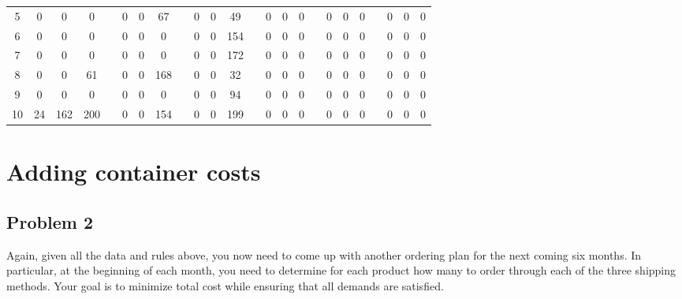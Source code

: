 \documentclass[12pt,a4paper]{article}
\begin{document}
\begin{table}[]
{\begin{tabular}{ccccllcccclccclccclccccc}
5       & 0      & 0       & 0      &  & 0                      & 0  & 67  &                      & 0  & 0                      & 49  &                      & 0  & 0                      & 0  &                      & 0  & 0                      & 0  &                      & 0       & 0       & 0      \\
6       & 0      & 0       & 0      &  & 0                      & 0  & 0   &                      & 0  & 0                      & 154 &                      & 0  & 0                      & 0  &                      & 0  & 0                      & 0  &                      & 0       & 0       & 0      \\
7       & 0      & 0       & 0      &  & 0                      & 0  & 0   &                      & 0  & 0                      & 172 &                      & 0  & 0                      & 0  &                      & 0  & 0                      & 0  &                      & 0       & 0       & 0      \\
8       & 0      & 0       & 61     &  & 0                      & 0  & 168 &                      & 0  & 0                      & 32  &                      & 0  & 0                      & 0  &                      & 0  & 0                      & 0  &                      & 0       & 0       & 0      \\
9       & 0      & 0       & 0      &  & 0                      & 0  & 0   &                      & 0  & 0                      & 94  &                      & 0  & 0                      & 0  &                      & 0  & 0                      & 0  &                      & 0       & 0       & 0      \\
10      & 24     & 162     & 200    &  & 0                      & 0  & 154 &                      & 0  & 0                      & 199 &                      & 0  & 0                      & 0  &                      & 0  & 0                      & 0  &                      & 0       & 0       & 0      \\ \hline
\end{tabular}}
\end{table}

\section{Adding container costs}
\subsection*{Problem 2}
Again, given all the data and rules above, you now need to come up with another ordering
plan for the next coming six months. In particular, at the beginning of each month, you
need to determine for each product how many to order through each of the three shipping
methods. Your goal is to minimize total cost while ensuring that all demands are satisfied.\\
\end{document}
